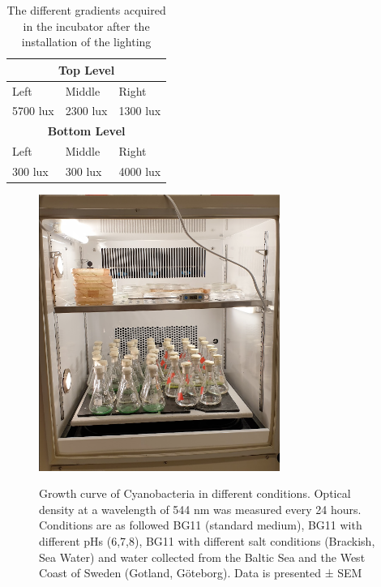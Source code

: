 \begin{table}[!htpb]
\caption{The different gradients acquired in the incubator after the installation of the lighting}
\label{tab:gradients}
\centering
\begin{tabular}{|l|l|l|} 
\hline
\multicolumn{3}{|c|}{\textbf{Top Level }}       \\ 
\hline
Left~    & Middle   & Right                     \\ 
\hline
5700 lux & 2300 lux & 1300 lux                  \\ 
\hline
\multicolumn{3}{|c|}{\textbf{Bottom Level }}    \\ 
\hline
Left     & Middle   & Right                     \\ 
\hline
300 lux  & 300 lux  & 4000 lux                  \\
\hline
\end{tabular}
\end{table}
\FloatBarrier

\begin{figure}[!htbp]
    \centering
    \includegraphics[width=0.7\textwidth]{images/chap2/chap2_cyano_02.png}
    \label{fig:ch2cyano02}
    \caption{Growth curve of Cyanobacteria in different conditions. Optical density at a wavelength of 544 nm was measured every 24 hours. Conditions are as followed BG11 (standard medium), BG11 with different pHs (6,7,8), BG11 with different salt conditions (Brackish, Sea Water) and water collected from the Baltic Sea and the West Coast of Sweden (Gotland, Göteborg). Data is presented ± SEM} 
\end{figure}
\FloatBarrier

